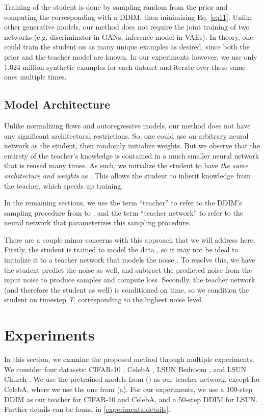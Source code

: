 \documentclass[12pt,a4paper]{article}
\newcommand{\cited}[1]{\citeauthor{#1} (\citeyear{#1})}
\newcommand{\citebracket}[1]{\cite{#1}}
\begin{document}
Training of the student is done by sampling random  from the prior  and computing the corresponding  with a DDIM, then minimizing Eq. \eqref{eq11}. Unlike other generative models, our method does not require the joint training of two networks (e.g. discriminator in GANs, inference model in VAEs). In theory, one could train the student on as many unique examples as desired, since both the prior and the teacher model are known. In our experiments however, we use only 1.024 million synthetic examples for each dataset and iterate over these same ones multiple times.

\subsection{Model Architecture}
Unlike normalizing flows and autoregressive models, our method does not have any significant architectural restrictions. So, one could use an arbitrary neural network as the student, then randomly initialize weights.
But we observe that the entirety of the teacher's knowledge is contained in a much smaller neural network  that is reused many times. As such, we initialize the student to have \textit{the same architecture and weights} as . This allows the student to inherit knowledge from the teacher, which speeds up training. 

In the remaining sections, we use the term ``teacher'' to refer to the DDIM's sampling procedure from  to , and the term ``teacher network'' to refer to the neural network  that parameterizes this sampling procedure.

There are a couple minor concerns with this approach that we will address here. Firstly, the student is trained to model the data , so it may not be ideal to initialize it to a teacher network that models the noise . To resolve this, we have the student predict the noise as well, and subtract the predicted noise from the input noise  to produce samples and compute loss. Secondly, the teacher network (and therefore the student as well) is conditioned on time, so we condition the student on timestep \textit{T}, corresponding to the highest noise level.

\section{Experiments}
In this section, we examine the proposed method through multiple experiments. We consider four datasets: CIFAR-10  \citebracket{cifar}, CelebA  \citebracket{celeba}, LSUN \citebracket{lsun} Bedroom , and LSUN Church . We use the pretrained models from \cited{ddpm} as our teacher network, except for CelebA, where we use the one from \citeauthor{ddim} (\citeyear{ddim}a). For our experiments, we use a 100-step DDIM as our teacher for CIFAR-10 and CelebA, and a 50-step DDIM for LSUN. Further details can be found in \autoref{experimentaldetails}.
\end{document}
